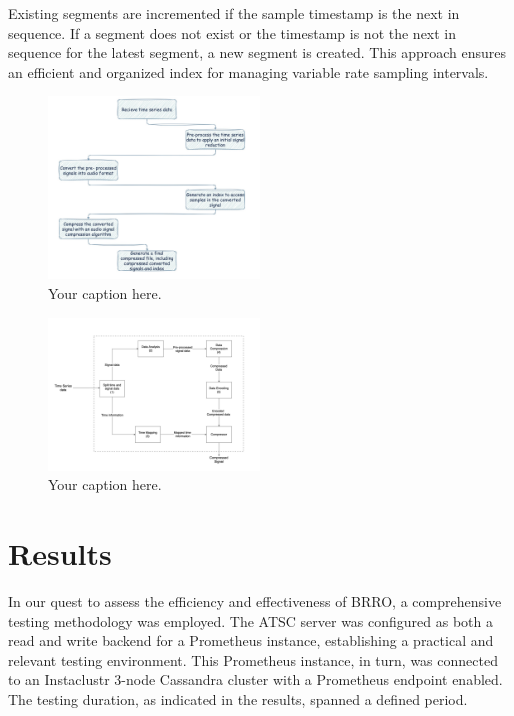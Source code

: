 \documentclass[conference]{IEEEtran}
\begin{document}
Existing segments are incremented if the sample timestamp is the next in sequence. If a segment does not exist or the timestamp is not the next in sequence for the latest segment, a new segment is created. This approach ensures an efficient and organized index for managing variable rate sampling intervals.

\begin{figure}[h]
  \centering
  \includegraphics[width=0.5\textwidth]{Fig3.png}
  \caption{Your caption here.}
  \label{Fig.3}
\end{figure}


\begin{figure}[h]
  \centering
  \includegraphics[width=0.5\textwidth]{Fig4.png}
  \caption{Your caption here.}
  \label{Fig.4}
\end{figure}




\section{Results}

In our quest to assess the efficiency and effectiveness of BRRO, a comprehensive testing methodology was employed. The ATSC server was configured as both a read and write backend for a Prometheus instance, establishing a practical and relevant testing environment. This Prometheus instance, in turn, was connected to an Instaclustr 3-node Cassandra cluster with a Prometheus endpoint enabled. The testing duration, as indicated in the results, spanned a defined period.
\end{document}

